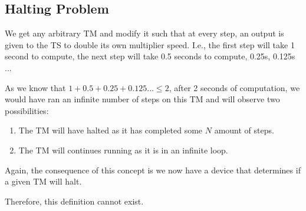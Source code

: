 \documentclass{report}
\begin{document}
\subsection{Halting Problem}

We get any arbitrary TM and modify it such that at every step, an output is given to the TS to double its own multiplier speed. I.e., the first step will take 1 second to compute, the next step will take 0.5 seconds to compute, 0.25s, 0.125s ...

As we know that $1 + 0.5 + 0.25 + 0.125 ... \le 2$, after 2 seconds of computation, we would have ran an infinite number of steps on this TM and will observe two possibilities:

\begin{enumerate}
  \item The TM will have halted as it has completed some $N$ amount of steps.
  \item The TM will continues running as it is in an infinite loop.
\end{enumerate}

Again, the consequence of this concept is we now have a device that determines if a given TM will halt.

Therefore, this definition cannot exist.
\end{document}
